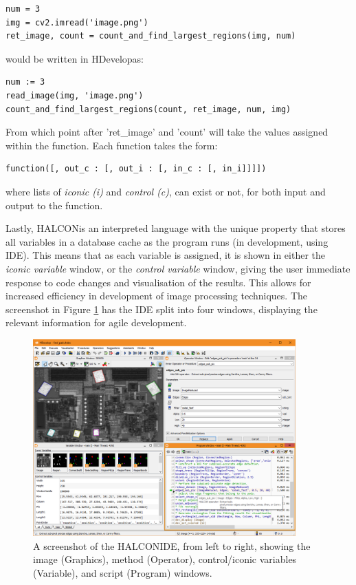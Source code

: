 \documentclass[fleqn,twoside,12pt]{report}
\begin{document}
\begin{lstlisting}
num = 3
img = cv2.imread('image.png')
ret_image, count = count_and_find_largest_regions(img, num)
\end{lstlisting} 

would be written in HDevelop\texttrademark as:

\begin{lstlisting}
num := 3
read_image(img, 'image.png')
count_and_find_largest_regions(count, ret_image, num, img)
\end{lstlisting} 

From which point after 'ret\_image' and 'count' will take the values assigned within the function. Each function takes the form:

\begin{lstlisting}
function([, out_c : [, out_i : [, in_c : [, in_i]]]])
\end{lstlisting} 

where lists of  \textit{iconic (i)} and  \textit{control (c)}, can exist or not, for both input and output to the function.


Lastly, HALCON\texttrademark is an interpreted language with the unique property that stores all variables in a database cache as the program runs (in development, using IDE). This means that as each variable is assigned, it is shown in either the \textit{iconic variable} window, or the \textit{control variable} window, giving the user immediate response to code changes and visualisation of the results. This allows for increased efficiency in development of image processing techniques. The screenshot in Figure \ref{fig:halcon_ide} has the IDE split into four windows, displaying the relevant information for agile development.  


\begin{figure}[h]
	\centering
	\includegraphics[width=0.9\textwidth]{halcon_ide.png}
	\caption{A screenshot of the HALCON\texttrademark IDE, from left to right, showing the image (Graphics), method (Operator), control/iconic variables (Variable), and script (Program) windows.}
	\label{fig:halcon_ide}
\end{figure} 
\end{document}
